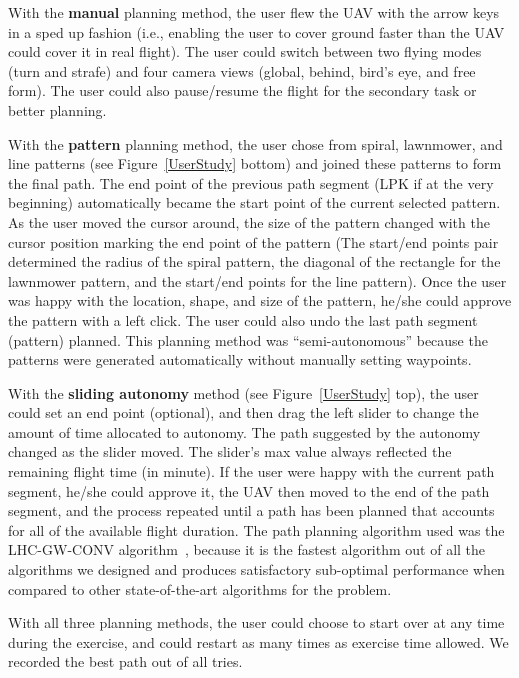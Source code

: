 With the \textbf{manual} planning method, the user flew the UAV with the arrow keys in a sped up fashion (i.e., enabling the user to cover ground faster than the UAV could cover it in real flight). The user could switch between two flying modes (turn and strafe) and four camera views (global, behind, bird's eye, and free form). The user could also pause/resume the flight for the secondary task or better planning.

With the \textbf{pattern} planning method, the user chose from spiral, lawnmower, and line patterns (see Figure~\ref{UserStudy} bottom) and joined these patterns to form the final path. The end point of the previous path segment (LPK if at the very beginning) automatically became the start point of the current selected pattern. As the user moved the cursor around, the size of the pattern changed with the cursor position marking the end point of the pattern (The start/end points pair determined the radius of the spiral pattern, the diagonal of the rectangle for the lawnmower pattern, and the start/end points for the line pattern). Once the user was happy with the location, shape, and size of the pattern, he/she could approve the pattern with a left click. The user could also undo the last path segment (pattern) planned. This planning method was ``semi-autonomous'' because the patterns were generated automatically without manually setting waypoints.

With the \textbf{sliding autonomy} method (see Figure~\ref{UserStudy} top), the user could set an end point (optional), and then drag the left slider to change the amount of time allocated to autonomy. The path suggested by the autonomy changed as the slider moved. The slider's max value always reflected the remaining flight time (in minute). If the user were happy with the current path segment, he/she could approve it, the UAV then moved to the end of the path segment, and the process repeated until a path has been planned that accounts for all of the available flight duration. The path planning algorithm used was the LHC-GW-CONV algorithm~\cite{Lin2009UAV, Lin2014Hierarchical}, because it is the fastest algorithm out of all the algorithms we designed and produces satisfactory sub-optimal performance when compared to other state-of-the-art algorithms for the problem.

With all three planning methods, the user could choose to start over at any time during the exercise, and could restart as many times as exercise time allowed. We recorded the best path out of all tries.

